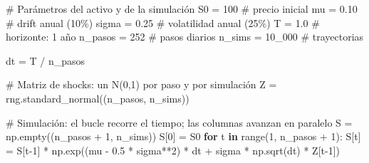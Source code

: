\documentclass[
  spanish,
  letterpaper,
  DIV=11,
  numbers=noendperiod]{scrreprt}
\newenvironment{Shaded}{\begin{snugshade}}{\end{snugshade}}
\newcommand{\BuiltInTok}[1]{\textcolor[rgb]{0.00,0.23,0.31}{#1}}
\newcommand{\CommentTok}[1]{\textcolor[rgb]{0.37,0.37,0.37}{#1}}
\newcommand{\ControlFlowTok}[1]{\textcolor[rgb]{0.00,0.23,0.31}{\textbf{#1}}}
\newcommand{\DecValTok}[1]{\textcolor[rgb]{0.68,0.00,0.00}{#1}}
\newcommand{\FloatTok}[1]{\textcolor[rgb]{0.68,0.00,0.00}{#1}}
\newcommand{\KeywordTok}[1]{\textcolor[rgb]{0.00,0.23,0.31}{\textbf{#1}}}
\newcommand{\NormalTok}[1]{\textcolor[rgb]{0.00,0.23,0.31}{#1}}
\newcommand{\OperatorTok}[1]{\textcolor[rgb]{0.37,0.37,0.37}{#1}}
\begin{document}
\label{gbm}
\begin{Shaded}
\begin{Highlighting}[]
\CommentTok{\# Parámetros del activo y de la simulación}
\NormalTok{S0 }\OperatorTok{=} \DecValTok{100}          \CommentTok{\# precio inicial}
\NormalTok{mu }\OperatorTok{=} \FloatTok{0.10}         \CommentTok{\# drift anual (10\%)}
\NormalTok{sigma }\OperatorTok{=} \FloatTok{0.25}      \CommentTok{\# volatilidad anual (25\%)}
\NormalTok{T }\OperatorTok{=} \FloatTok{1.0}           \CommentTok{\# horizonte: 1 año}
\NormalTok{n\_pasos }\OperatorTok{=} \DecValTok{252}     \CommentTok{\# pasos diarios}
\NormalTok{n\_sims }\OperatorTok{=} \DecValTok{10\_000}   \CommentTok{\# trayectorias}

\NormalTok{dt }\OperatorTok{=}\NormalTok{ T }\OperatorTok{/}\NormalTok{ n\_pasos}

\CommentTok{\# Matriz de shocks: un N(0,1) por paso y por simulación}
\NormalTok{Z }\OperatorTok{=}\NormalTok{ rng.standard\_normal((n\_pasos, n\_sims))}

\CommentTok{\# Simulación: el bucle recorre el tiempo; las columnas avanzan en paralelo}
\NormalTok{S }\OperatorTok{=}\NormalTok{ np.empty((n\_pasos }\OperatorTok{+} \DecValTok{1}\NormalTok{, n\_sims))}
\NormalTok{S[}\DecValTok{0}\NormalTok{] }\OperatorTok{=}\NormalTok{ S0}
\ControlFlowTok{for}\NormalTok{ t }\KeywordTok{in} \BuiltInTok{range}\NormalTok{(}\DecValTok{1}\NormalTok{, n\_pasos }\OperatorTok{+} \DecValTok{1}\NormalTok{):}
\NormalTok{    S[t] }\OperatorTok{=}\NormalTok{ S[t}\OperatorTok{{-}}\DecValTok{1}\NormalTok{] }\OperatorTok{*}\NormalTok{ np.exp((mu }\OperatorTok{{-}} \FloatTok{0.5} \OperatorTok{*}\NormalTok{ sigma}\OperatorTok{**}\DecValTok{2}\NormalTok{) }\OperatorTok{*}\NormalTok{ dt }\OperatorTok{+}\NormalTok{ sigma }\OperatorTok{*}\NormalTok{ np.sqrt(dt) }\OperatorTok{*}\NormalTok{ Z[t}\OperatorTok{{-}}\DecValTok{1}\NormalTok{])}


\end{Highlighting}
\end{Shaded}
\end{document}
